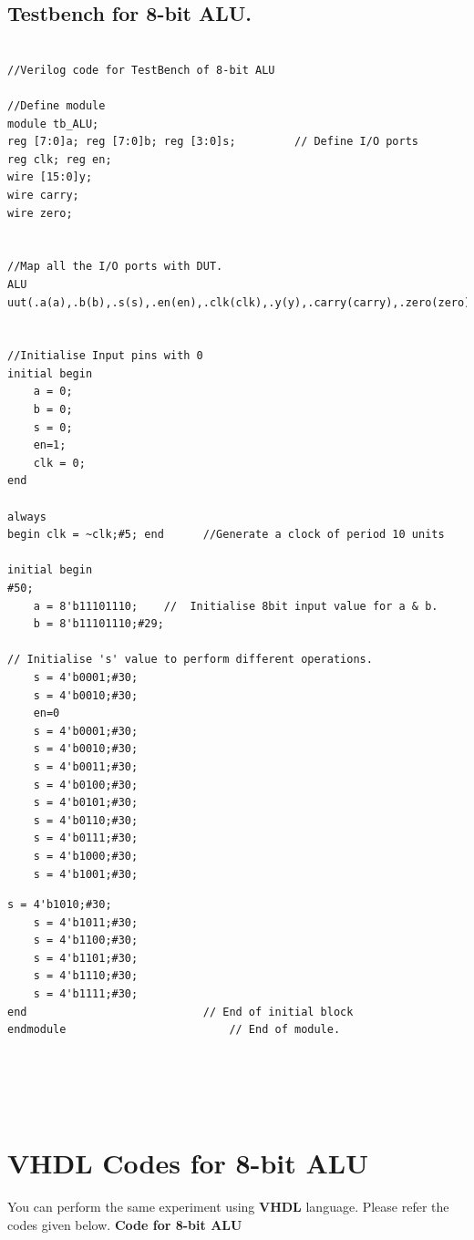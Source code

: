 \documentclass[12pt,singleside,a4paper]{article}
\begin{document}
\subsection{Testbench for 8-bit ALU.}
\begin{lstlisting}[style=verilog-style]

//Verilog code for TestBench of 8-bit ALU

//Define module
module tb_ALU;
reg [7:0]a; reg [7:0]b; reg [3:0]s;         // Define I/O ports
reg clk; reg en; 
wire [15:0]y;
wire carry;
wire zero;


//Map all the I/O ports with DUT.
ALU uut(.a(a),.b(b),.s(s),.en(en),.clk(clk),.y(y),.carry(carry),.zero(zero));


//Initialise Input pins with 0
initial begin
	a = 0;
	b = 0;
	s = 0;
	en=1;
	clk = 0;
end

always
begin clk = ~clk;#5; end      //Generate a clock of period 10 units

initial begin
#50;
	a = 8'b11101110;    //	Initialise 8bit input value for a & b.
	b = 8'b11101110;#29;

// Initialise 's' value to perform different operations.	
	s = 4'b0001;#30;   
	s = 4'b0010;#30;
	en=0
	s = 4'b0001;#30;   
	s = 4'b0010;#30;
	s = 4'b0011;#30;
	s = 4'b0100;#30;
	s = 4'b0101;#30;
	s = 4'b0110;#30;
	s = 4'b0111;#30;
	s = 4'b1000;#30;
	s = 4'b1001;#30;
\end{lstlisting}
\newpage
\begin{lstlisting}[style=verilog-style]
	s = 4'b1010;#30;
	s = 4'b1011;#30;
	s = 4'b1100;#30;
	s = 4'b1101;#30;
	s = 4'b1110;#30;
	s = 4'b1111;#30;
end                           // End of initial block
endmodule					      // End of module.

	
	
	
\end{lstlisting}

\newpage
\section{VHDL Codes for 8-bit ALU}
You can perform the same experiment using \textbf{VHDL} language.
Please refer the codes given below.
\textbf{Code for 8-bit ALU}
\end{document}
